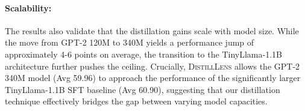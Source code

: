 \documentclass{article}
\theoremstyle{plain}
\theoremstyle{definition}
\theoremstyle{remark}
\begin{document}

\paragraph{Scalability:}
The results also validate that the distillation gains scale with model size. While the move from GPT-2 120M to 340M yields a performance jump of approximately 4-6 points on average, the transition to the TinyLlama-1.1B architecture further pushes the ceiling. Crucially, \textsc{DistillLens} allows the GPT-2 340M model (Avg 59.96) to approach the performance of the significantly larger TinyLlama-1.1B SFT baseline (Avg 60.90), suggesting that our distillation technique effectively bridges the gap between varying model capacities.
\end{document}
